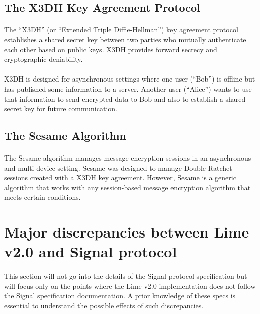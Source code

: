 \documentclass[a4paper,11pt]{article}
\begin{document}
  \subsection{The X3DH Key Agreement Protocol\cite{x3dh}}
    \paragraph{}The “X3DH” (or “Extended Triple Diffie-Hellman”) key
agreement protocol establishes a shared secret key between two parties
who mutually authenticate each other based on public keys. X3DH provides
forward secrecy and cryptographic deniability.
    \paragraph{}X3DH is designed for asynchronous settings where one user (“Bob”) is offline
but has published some information to a server. Another user (“Alice”) wants to
use that information to send encrypted data to Bob and also to establish a shared
secret key for future communication.

  \subsection{The Sesame Algorithm\cite{sesame}}
    \paragraph{}The Sesame algorithm manages message encryption
sessions in an asynchronous and multi-device setting.
Sesame was designed to manage Double Ratchet sessions\cite{doubleRatchet} created with a X3DH
key agreement\cite{x3dh}. However, Sesame is a generic algorithm that works with
any session-based message encryption algorithm that meets certain conditions.


\section{Major discrepancies between Lime v2.0 and Signal protocol}
\paragraph{}This section will not go into the details of the Signal protocol specification but will focus only on the points where the Lime v2.0 implementation does not follow the Signal specification documentation. A prior knowledge of these specs is essential to understand the possible effects of such discrepancies.
\end{document}
